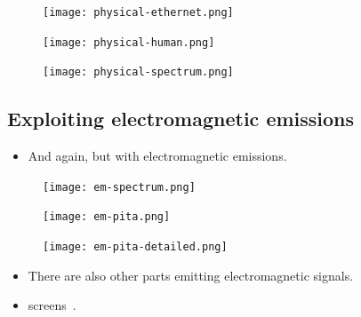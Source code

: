 \begin{frame}
  \begin{figure}
    \texttt{[image: physical-ethernet.png]}
  \end{figure}
\end{frame}

\begin{frame}
  \begin{figure}
    \texttt{[image: physical-human.png]}
  \end{figure}
\end{frame}

\begin{frame}
  \begin{figure}
    \texttt{[image: physical-spectrum.png]}
  \end{figure}
\end{frame}

\subsection{Exploiting electromagnetic emissions}

\begin{frame}
  \begin{itemize}
    \item And again, but with 
      electromagnetic emissions.
  \end{itemize}
\end{frame}

\begin{frame}
  \begin{figure}
    \texttt{[image: em-spectrum.png]}
  \end{figure}
\end{frame}

\begin{frame}
  \begin{figure}
    \texttt{[image: em-pita.png]}
  \end{figure}
\end{frame}

\begin{frame}
  \begin{figure}
    \texttt{[image: em-pita-detailed.png]}
  \end{figure}
\end{frame}

\begin{frame}
  \begin{remark}
    \begin{itemize}
      \item There are also other parts emitting electromagnetic signals.
      \item \Eg screens~\cite{FlatPanelEmissions}.
    \end{itemize}
  \end{remark}
\end{frame}

